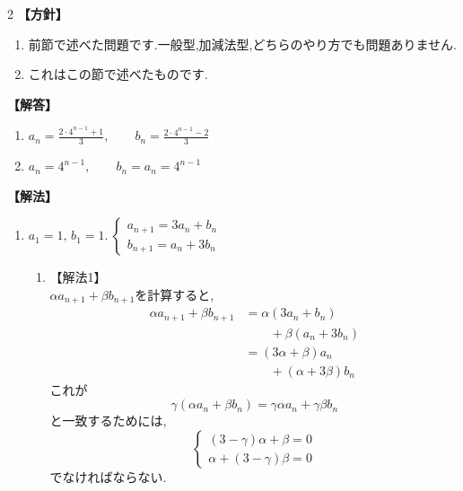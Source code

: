 \documentclass[dvipdfmx,a4paper,11pt,fleqn,openany]{jsbook}
\begin{document}
\begin{multicols*}{2}
      \noindent\textbf{【方針】}
      \begin{enumerate}[label=(\arabic*),parsep=3pt]
        \item 前節で述べた問題です.一般型,加減法型,どちらのやり方でも問題ありません.
        \item これはこの節で述べたものです.
      \end{enumerate}

      \noindent\textbf{【解答】}
      \begin{enumerate}[label=(\arabic*),parsep=3pt]
        \item $\displaystyle a_n=\frac{2\cdot4^{n-1}+1}{3},\qquad b_n=\frac{2\cdot4^{n-1}-2}{3}$
        \item $\displaystyle a_n=4^{n-1},\qquad b_n=a_n=4^{n-1}$
      \end{enumerate}

      \noindent\textbf{【解法】}
      \begin{enumerate}[label=(\arabic*),parsep=3pt]
      \item $\displaystyle a_1=1,\,b_1=1.\ \begin{cases}a_{n+1}=3a_n+b_n\\ b_{n+1}=a_n+3b_n\end{cases}$\\
            \begin{enumerate}
              \item 【解法1】\\
                    $\alpha a_{n+1}+\beta b_{n+1}$を計算すると,
                    \begin{align*}
                      \alpha a_{n+1}+\beta b_{n+1}
                        &=\alpha(3a_n+b_n)\\
                        &\qquad +\beta(a_n+3b_n)\\
                        &=(3\alpha+\beta)a_n\\
                        &\qquad +(\alpha+3\beta)b_n
                    \end{align*}
                    これが
                    \[
                      \gamma(\alpha a_n+\beta b_n)
                      =\gamma\alpha a_n+\gamma\beta b_n
                    \]
                    と一致するためには,
                    \[
                    \begin{cases}
                      (3-\gamma)\alpha+\beta=0\\
                      \alpha+(3-\gamma)\beta=0
                    \end{cases}
                    \]
                    でなければならない.


\end{enumerate}
\end{enumerate}
\end{multicols*}
\end{document}
